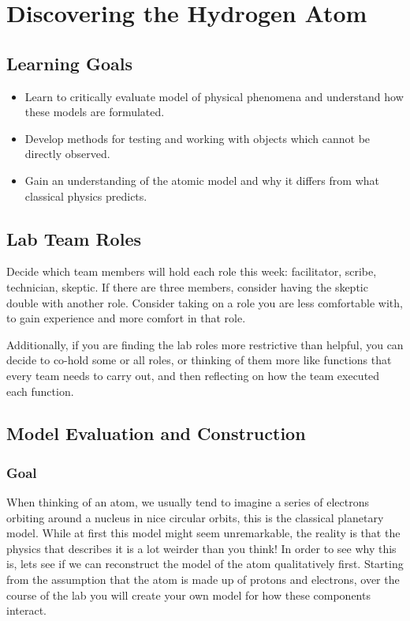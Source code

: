 \chapter{Discovering the Hydrogen Atom}

\section{Learning Goals}

\begin{itemize}
	\item Learn to critically evaluate model of physical phenomena and understand how these models are formulated.
	
	\item Develop methods for testing and working with objects which cannot be directly observed. 
	
	\item Gain an understanding of the atomic model and why it differs from what classical physics predicts.
\end{itemize}

\section{Lab Team Roles}

Decide which team members will hold each role this week: facilitator, scribe, technician, skeptic. If there are three members, consider having the skeptic double with another role. Consider taking on a role you are less comfortable with, to gain experience and more comfort in that role.

Additionally, if you are finding the lab roles more restrictive than helpful, you can decide to co-hold some or all roles, or thinking of them more like functions that every team needs to carry out, and then reflecting on how the team executed each function.

\section{Model Evaluation and Construction}

\subsection{Goal} 
When thinking of an atom, we usually tend to imagine a series of electrons orbiting around a nucleus in nice circular orbits, this is the classical planetary model. While at first this model might seem unremarkable, the reality is that the physics that describes it is a lot weirder than you think! In order to see why this is, lets see if we can reconstruct the model of the atom qualitatively first. Starting from the assumption that the atom is made up of protons and electrons, over the course of the lab you will create your own model for how these components interact.


